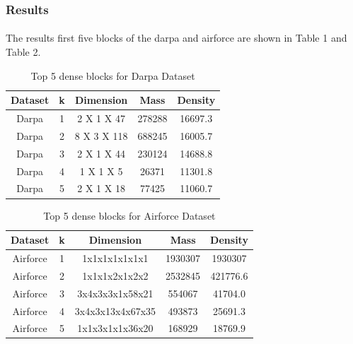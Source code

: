 \subsubsection{Results}
\paragraph{} The results first five blocks of the darpa and airforce are shown in Table 1 and Table 2.
\begin{table}
\centering
\begin{tabular}{|c|c|c|c|c|}
    \hline
        Dataset & k & Dimension & Mass & Density \\
    \hline
        Darpa & 1 & 2 X 1 X 47 & 278288 & 16697.3 \\
    \hline
        Darpa & 2 & 8 X 3 X 118 & 688245 & 16005.7 \\
    \hline
        Darpa & 3 & 2 X 1 X 44 & 230124 & 14688.8 \\
    \hline
        Darpa & 4 & 1 X 1 X 5 & 26371 & 11301.8 \\
    \hline
        Darpa & 5 & 2 X 1 X 18 & 77425 & 11060.7 \\
    \hline
\end{tabular}
\caption {Top 5 dense blocks for Darpa Dataset}
\end{table}

\begin{table}
\centering
\begin{tabular}{|c|c|c|c|c|}
    \hline
        Dataset & k & Dimension & Mass & Density \\
    \hline
        Airforce & 1 & 1x1x1x1x1x1x1 & 1930307 & 1930307 \\
    \hline
        Airforce & 2 & 1x1x1x2x1x2x2 & 2532845 & 421776.6 \\
    \hline
        Airforce & 3 & 3x4x3x3x1x58x21 & 554067 & 41704.0\\
    \hline
        Airforce & 4 & 3x4x3x13x4x67x35 & 493873 & 25691.3 \\
    \hline
        Airforce & 5 & 1x1x3x1x1x36x20 & 168929 & 18769.9 \\
    \hline
\end{tabular}
\caption {Top 5 dense blocks for Airforce Dataset}
\end{table}

